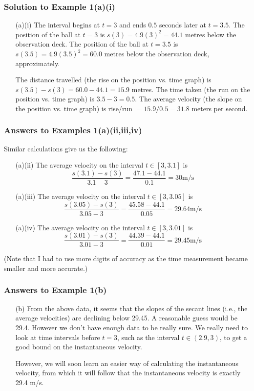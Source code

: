 \documentclass[serif,ignorenonframetext]{beamer}
\begin{document}
\begin{frame}
  \frametitle{Solution to Example 1(a)(i)}
  \begin{itemize}
  \item[(a)(i)] The interval begins at $t=3$ and ends $0.5$ seconds
    later at $t=3.5$.  The position of the ball at $t=3$ is
    $s(3)=4.9(3)^2 = 44.1$ metres below the observation deck.  The
    position of the ball at $t=3.5$ is $s(3.5)=4.9(3.5)^2=60.0$ metres
    below the observation deck, approximately.

    The distance travelled (the rise on the position vs. time graph)
    is $s(3.5)-s(3)=60.0-44.1=15.9$ metres.  The time taken (the run
    on the position vs. time graph) is $3.5-3=0.5$.  The average
    velocity (the slope on the position vs. time graph) is rise/run
    $= 15.9/0.5=31.8$ meters per second.
  \end{itemize}
\end{frame}

\begin{frame}
  \frametitle{Answers to Examples 1(a)(ii,iii,iv)}
  Similar calculations give us the following:
  \begin{itemize}
  \item[(a)(ii)] The average velocity on the interval $t\in [3,3.1]$ is
    \begin{displaymath}
      \frac{s(3.1)-s(3)}{3.1-3}=\frac{47.1-44.1}{0.1} = 30\mbox{m/s}
    \end{displaymath}
  \item[(a)(iii)] The average velocity on the interval $t\in [3,3.05]$ is
    \begin{displaymath}
      \frac{s(3.05)-s(3)}{3.05-3}=\frac{45.58-44.1}{0.05} = 29.64\mbox{m/s}
    \end{displaymath}
  \item[(a)(iv)] The average velocity on the interval $t\in [3,3.01]$ is
    \begin{displaymath}
      \frac{s(3.01)-s(3)}{3.01-3}=\frac{44.39-44.1}{0.01} = 29.45\mbox{m/s}
    \end{displaymath}
  \end{itemize}
  (Note that I had to use more digits of accuracy as the time measurement
  became smaller and more accurate.)
\end{frame}

\begin{frame}
  \frametitle{Answers to Example 1(b)}
  \begin{itemize}
  \item[(b)] From the above data, it seems that the slopes of the
    secant lines (i.e., the average velocities) are declining below
    29.45.  A reasonable guess would be 29.4.  However we don't have
    enough data to be really sure.  We really need to look at time
    intervals before $t=3$, such as the interval $t\in(2.9,3)$, to get
    a good bound on the instantaneous velocity.
  
    However, we will soon learn an easier way of calculating the
    instantaneous velocity, from which it will follow that the
    instantaneous velocity is exactly 29.4 m/s.
  \end{itemize}
\end{frame}
\end{document}
